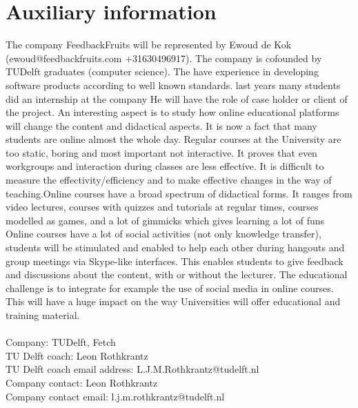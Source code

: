 \section*{Auxiliary information}

The company FeedbackFruits will be represented by Ewoud de Kok (ewoud@feedbackfruits.com +31630496917). The company is cofounded by TUDelft graduates (computer science). The have experience in developing software products according to well known standards. last years many students did an internship at the company He will have the role of case holder or client of the project. An interesting aspect is to study how online educational platforms will change the content and didactical aspects. It is now a fact that many students are online almost the whole day. Regular courses at the University are too static, boring and most important not interactive. It proves that even workgroups and interaction during classes are less effective. It is difficult to measure the effectivity/efficiency and to make effective changes in the way of teaching.Online courses have a broad spectrum of didactical forms. It ranges from video lectures, courses with quizzes and tutorials at regular times, courses modelled as games, and a lot of gimmicks which gives learning a lot of funs Online courses have a lot of social activities (not only knowledge transfer), students will be stimulated and enabled to help each other during hangouts and group meetings via Skype-like interfaces. This enables students to give feedback and discussions about the content, with or without the lecturer. The educational challenge is to integrate for example the use of social media in online courses. This will have a huge impact on the way Universities will offer educational and training material.
\\\\
Company: TUDelft, Fetch\\
TU Delft coach: Leon Rothkrantz\\
TU Delft coach email address: L.J.M.Rothkrantz@tudelft.nl\\
Company contact: Leon Rothkrantz\\
Company contact email: l.j.m.rothkrantz@tudelft.nl